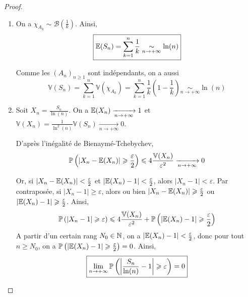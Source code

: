 \begin{proof}
    \phantom{}
    \begin{enumerate}
        \item On a $\chi_{A_{k}}\sim\mathcal{B}\left(\frac{1}{k}\right)$. Ainsi,
        \begin{equation}
            \boxed{\E(S_{n})=\sum_{k=1}^{n}\frac{1}{k}\underset{n\to+\infty}{\sim}\ln(n)}
        \end{equation}

        Comme les $(A_{n})_{n\geqslant1}$ sont indépendants, on a aussi 
        \begin{equation}
            \boxed{\mathbb{V}(S_{n})=\sum_{k=1}^{n}\mathbb{V}(\chi_{A_{k}})=\sum_{k=1}^{n}\frac{1}{k}\left(1-\frac{1}{k}\right)\underset{n\to+\infty}{\sim}\ln(n)}
        \end{equation}

        \item Soit $X_{n}=\frac{S_{n}}{\ln(n)}$. On a $\E(X_{n})\xrightarrow[n\to+\infty]{}1$ et $\mathbb{V}(X_{n})=\frac{1}{\ln^{2}(n)}\mathbb{V}(S_{n})\xrightarrow[n\to+\infty]{}0$.
        
        D'après l'inégalité de Bienaymé-Tchebychev,
        \begin{equation}
            \P\left(\left\lvert X_{n}-\E(X_{n})\right\rvert\geqslant\frac{\varepsilon}{2}\right)\leqslant4\frac{\mathbb{V}(X_{n})}{\varepsilon^{2}}\xrightarrow[n\to+\infty]{}0
        \end{equation}

        Or, si $\left\lvert X_{n}-\E(X_{n})\right\rvert<\frac{\varepsilon}{2}$ et $\left\lvert\E(X_{n})-1\right\rvert<\frac{\varepsilon}{2}$, alors $\left\lvert X_{n}-1\right\rvert<\varepsilon$.
        Par contraposée, si $\left\lvert X_{n}-1\right\rvert\geqslant\varepsilon$, alors ou bien $\left\lvert X_{n}-\E(X_{n})\right\rvert\geqslant\frac{\varepsilon}{2}$ ou $\left\lvert\E(X_{n})-1\right\rvert\geqslant\frac{\varepsilon}{2}$. Ainsi,
        \begin{equation}
            \P\left(\left\lvert X_{n}-1\right\rvert\geqslant\varepsilon\right)\leqslant4\frac{\mathbb{V}(X_{n})}{\varepsilon^{2}}+\P\left(\left\lvert\E(X_{n})-1\right\rvert\geqslant\frac{\varepsilon}{2}\right)
        \end{equation}
        A partir d'un certain rang $N_{0}\in\N$, on a $\left\lvert\E(X_{n})-1\right\rvert<\frac{\varepsilon}{2}$, donc pour tout $n\geqslant N_{0}$, on a $\P\left(\left\lvert\E(X_{n})-1\right\rvert\geqslant\frac{\varepsilon}{2}\right)=0$. Ainsi,
        \begin{equation}
            \boxed{\lim\limits_{n\to+\infty}\P\left(\left\lvert\frac{S_{n}}{\ln(n)}-1\right\rvert\geqslant\varepsilon\right)=0}
        \end{equation}
    \end{enumerate}
\end{proof}

